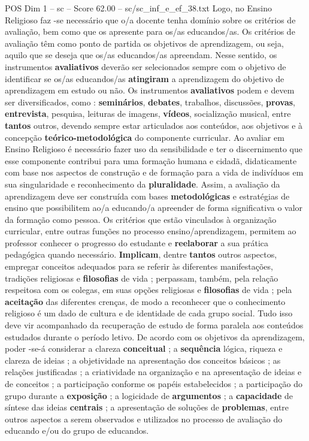 \begin{textsample}{POS Dim 1 – sc – Score 62.00 – sc/sc\_inf\_e\_ef\_38.txt}
Logo, no Ensino Religioso faz -se necessário que o/a docente tenha domínio sobre os critérios de avaliação, bem como que os apresente para os/as educandos/as.
Os critérios de avaliação têm como ponto de partida os objetivos de aprendizagem, ou seja, aquilo que se deseja que os/as educandos/as apreendam.
Nesse sentido, os instrumentos \textbf{avaliativos} deverão ser selecionados sempre com o objetivo de identificar se os/as educandos/as \textbf{atingiram} a aprendizagem do objetivo de aprendizagem em estudo ou não.
Os instrumentos \textbf{avaliativos} podem e devem ser diversificados, como : \textbf{seminários}, \textbf{debates}, trabalhos, discussões, \textbf{provas}, \textbf{entrevista}, pesquisa, leituras de imagens, \textbf{vídeos}, socialização musical, entre \textbf{tantos} outros, devendo sempre estar articulados aos conteúdos, aos objetivos e à concepção \textbf{teórico-metodológica} do componente curricular.
Ao avaliar em Ensino Religioso é necessário fazer uso da sensibilidade e ter o discernimento que esse componente contribui para uma formação humana e cidadã, didaticamente com base nos aspectos de construção e de formação para a vida de indivíduos em sua singularidade e reconhecimento da \textbf{pluralidade}.
Assim, a avaliação da aprendizagem deve ser construída com bases \textbf{metodológicas} e estratégias de ensino que possibilitem ao/a educando/a apreender de forma significativa o valor da formação como pessoa.
Os critérios que estão vinculados à organização curricular, entre outras funções no processo ensino/aprendizagem, permitem ao professor conhecer o progresso do estudante e \textbf{reelaborar} a sua prática pedagógica quando necessário. \textbf{Implicam}, dentre \textbf{tantos} outros aspectos, empregar conceitos adequados para se referir às diferentes manifestações, tradições religiosas e \textbf{filosofias} de vida ; perpassam, também, pela relação respeitosa com os colegas, em suas opções religiosas e \textbf{filosofias} de vida ; pela \textbf{aceitação} das diferentes crenças, de modo a reconhecer que o conhecimento religioso é um dado de cultura e de identidade de cada grupo social.
Tudo isso deve vir acompanhado da recuperação de estudo de forma paralela aos conteúdos estudados durante o período letivo.
De acordo com os objetivos da aprendizagem, poder -se-á considerar a clareza \textbf{conceitual} ; a \textbf{sequência} lógica, riqueza e clareza de ideias ; a objetividade na apresentação dos conceitos básicos ; as relações justificadas ; a criatividade na organização e na apresentação de ideias e de conceitos ; a participação conforme os papéis estabelecidos ; a participação do grupo durante a \textbf{exposição} ; a logicidade de \textbf{argumentos} ; a \textbf{capacidade} de síntese das ideias \textbf{centrais} ; a apresentação de soluções de \textbf{problemas}, entre outros aspectos a serem observados e utilizados no processo de avaliação do educando e/ou do grupo de educandos.

\end{textsample}

